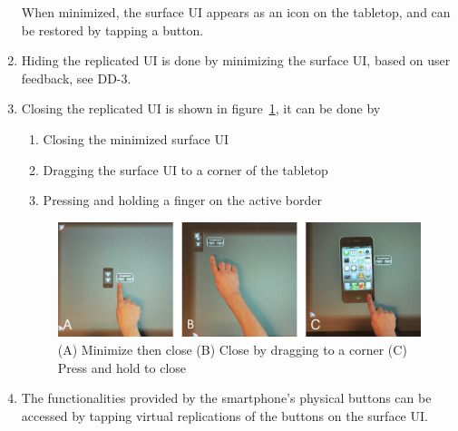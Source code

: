 \begin{enumerate}[{DD}-1]
When minimized, the surface UI appears as an icon on the tabletop, and can be restored by tapping a button.
\item Hiding the replicated UI is done by minimizing the surface UI, based on user feedback, see DD-3.
\item Closing the replicated UI is shown in figure~\ref{fig:sqClose}, it can be done by
	\begin{enumerate}[1{.}]
	\item Closing the minimized surface UI
	\item Dragging the surface UI to a corner of the tabletop
	\item Pressing and holding a finger on the active border
	\end{enumerate}

\begin{figure}[htb]
  \centering
    \includegraphics[width=0.7\linewidth]{images/sqClose}
  \caption{(A) Minimize then close (B) Close by dragging to a corner (C) Press and hold to close}
  \label{fig:sqClose}
\end{figure}

\item The functionalities provided by the smartphone's physical buttons can be accessed by tapping virtual replications of the buttons on the surface UI.
\end{enumerate}

\firmlists


